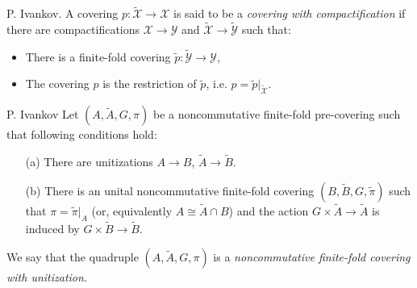 \documentclass{beamer}
\theoremstyle{plain}
\begin{document}
\begin{frame}


\begin{definition}\label{top_cov_comp_defn}
	\alert{P. Ivankov}. 	A   covering $p: \widetilde{   \mathcal X } \to \mathcal X$ is said to be a \textit{ covering with compactification} if there are compactifications ${   \mathcal X } \to {   \mathcal Y }$ and $\widetilde{   \mathcal X } \to \widetilde{   \mathcal Y }$ such that:
	\begin{itemize}
		\item There is a finite-fold  covering $\widetilde{p}:\widetilde{   \mathcal Y }\to {   \mathcal Y }$,
		\item The covering $p$ is the restriction of $\widetilde{p}$, i.e. $p = \widetilde{p}|_{\widetilde{   \mathcal X }}$.
	\end{itemize}
\end{definition}
\begin{definition}\label{fin_comp_defn}\alert{P. Ivankov}
	Let $\left(A, \widetilde{A}, G, \pi \right)$ be a noncommutative finite-fold  pre-covering such  that following conditions hold:
	\begin{enumerate}
		\item[(a)] 
		There are unitizations $A \to B$, $\widetilde{A} \to \widetilde{B}$.
		\item[(b)] There is an %
		unital  noncommutative finite-fold covering	$\left(B ,\widetilde{B}, G, \widetilde{\pi} \right)$ such that $\pi = \widetilde{\pi}|_A$ (or, equivalently $A \cong \widetilde{A}\cap B$) and the action $G \times\widetilde{A} \to \widetilde{A}$ is induced by $G \times\widetilde{B} \to \widetilde{B}$.
	\end{enumerate}
	We say that the  quadruple $\left(A, \widetilde{A}, G, \pi \right)$ is a
	\textit{noncommutative finite-fold covering with unitization}. 
\end{definition}

\end{frame}
\end{document}
